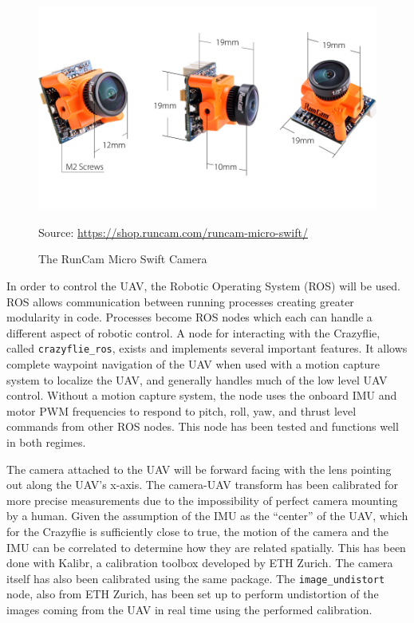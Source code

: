 \documentclass[12pt]{article}
\begin{document}
\begin{figure}
	\centering
	\includegraphics[scale=0.3]{micro-swift-size}
	\caption[The RunCam Micro Swift Camera]{The RunCam Micro Swift Camera}
	\vspace{8pt}
	\small Source: \url{https://shop.runcam.com/runcam-micro-swift/}
	\label{crazyflie_cam}
\end{figure}

In order to control the UAV, the Robotic Operating System (ROS) will be used. ROS allows communication between running processes creating greater modularity in code. Processes become ROS nodes which each can handle a different aspect of robotic control. A node for interacting with the Crazyflie, called \verb|crazyflie_ros|\cite{crazyflie_ros}, exists and implements several important features. It allows complete waypoint navigation of the UAV when used with a motion capture system to localize the UAV, and generally handles much of the low level UAV control. Without a motion capture system, the node uses the onboard IMU and motor PWM frequencies to respond to pitch, roll, yaw, and thrust level commands from other ROS nodes. This node has been tested and functions well in both regimes.

The camera attached to the UAV will be forward facing with the lens pointing out along the UAV's x-axis. The camera-UAV transform has been calibrated for more precise measurements due to the impossibility of perfect camera mounting by a human. Given the assumption of the IMU as the ``center'' of the UAV, which for the Crazyflie is sufficiently close to true, the motion of the camera and the IMU can be correlated to determine how they are related spatially. This has been done with Kalibr\cite{Kalibr}, a calibration toolbox developed by ETH Zurich. The camera itself has also been calibrated using the same package. The \verb|image_undistort| \cite{image_undistort} node, also from ETH Zurich, has been set up to perform undistortion of the images coming from the UAV in real time using the performed calibration. 
\end{document}
